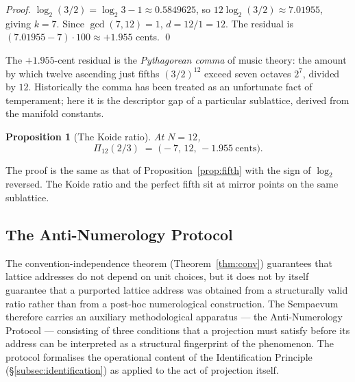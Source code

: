 \documentclass[11pt,a4paper]{article}
\newtheorem{proposition}[theorem]{Proposition}
\theoremstyle{definition}
\theoremstyle{remark}
\begin{document}
\begin{proof}
$\log_{2}(3/2) = \log_{2}3 - 1 \approx 0.5849625$, so $12\log_{2}(3/2) \approx 7.01955$, giving $k=7$. Since $\gcd(7,12)=1$, $d=12/1=12$. The residual is $(7.01955 - 7)\cdot 100 \approx +1.955$ cents. \qed
\end{proof}

The $+1.955$-cent residual is the \emph{Pythagorean comma} of music theory: the amount by which twelve ascending just fifths $(3/2)^{12}$ exceed seven octaves $2^{7}$, divided by $12$. Historically the comma has been treated as an unfortunate fact of temperament; here it is the descriptor gap of a particular sublattice, derived from the manifold constants.

\begin{proposition}[The Koide ratio]\label{prop:koide}
At $N=12$,
\[
\Pi_{12}(2/3) \;=\; \bigl(-7,\,12,\,-1.955\ \text{cents}\bigr).
\]
\end{proposition}

The proof is the same as that of Proposition~\ref{prop:fifth} with the sign of $\log_{2}$ reversed. The Koide ratio and the perfect fifth sit at mirror points on the same sublattice.

\subsection{The Anti-Numerology Protocol}\label{subsec:anti-numerology}

The convention-independence theorem (Theorem~\ref{thm:conv}) guarantees that lattice addresses do not depend on unit choices, but it does not by itself guarantee that a purported lattice address was obtained from a structurally valid ratio rather than from a post-hoc numerological construction. The Sempaevum therefore carries an auxiliary methodological apparatus --- the Anti-Numerology Protocol --- consisting of three conditions that a projection must satisfy before its address can be interpreted as a structural fingerprint of the phenomenon. The protocol formalises the operational content of the Identification Principle (\S\ref{subsec:identification}) as applied to the act of projection itself.
\end{document}
